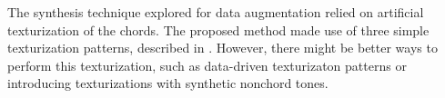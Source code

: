
The synthesis technique explored for data augmentation
relied on artificial texturization of the chords. The
proposed method made use of three simple texturization
patterns, described in .
However, there might be better ways to perform this
texturization, such as data-driven texturizaton patterns or
introducing texturizations with synthetic nonchord tones.
